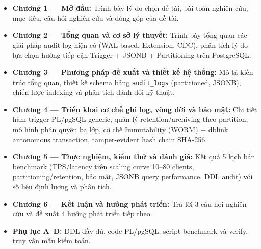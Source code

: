 \begin{itemize}
    \item \textbf{Chương 1 --- Mở đầu:} Trình bày lý do chọn đề tài, bài toán nghiên cứu, mục tiêu, câu hỏi nghiên cứu và đóng góp của đề tài.
    \item \textbf{Chương 2 --- Tổng quan và cơ sở lý thuyết:} Trình bày tổng quan các giải pháp audit log hiện có (WAL-based, Extension, CDC), phân tích lý do lựa chọn hướng tiếp cận Trigger + JSONB + Partitioning trên PostgreSQL.
    \item \textbf{Chương 3 --- Phương pháp đề xuất và thiết kế hệ thống:} Mô tả kiến trúc tổng quan, thiết kế schema bảng \texttt{audit\_logs} (partitioned, JSONB), chiến lược indexing và phân tích đánh đổi kỹ thuật.
    \item \textbf{Chương 4 --- Triển khai cơ chế ghi log, vòng đời và bảo mật:} Chi tiết hàm trigger PL/pgSQL generic, quản lý retention/archiving theo partition, mô hình phân quyền ba lớp, cơ chế Immutability (WORM) + dblink autonomous transaction, tamper-evident hash chain SHA-256.
    \item \textbf{Chương 5 --- Thực nghiệm, kiểm thử và đánh giá:} Kết quả 5 kịch bản benchmark (TPS/latency trên scaling curve 10--80 clients, partitioning/retention, bảo mật, JSONB query performance, DDL audit) với số liệu định lượng và phân tích.
    \item \textbf{Chương 6 --- Kết luận và hướng phát triển:} Trả lời 3 câu hỏi nghiên cứu và đề xuất 4 hướng phát triển tiếp theo.
    \item \textbf{Phụ lục A--D:} DDL đầy đủ, code PL/pgSQL, script benchmark và verify, truy vấn mẫu kiểm toán.
\end{itemize}
